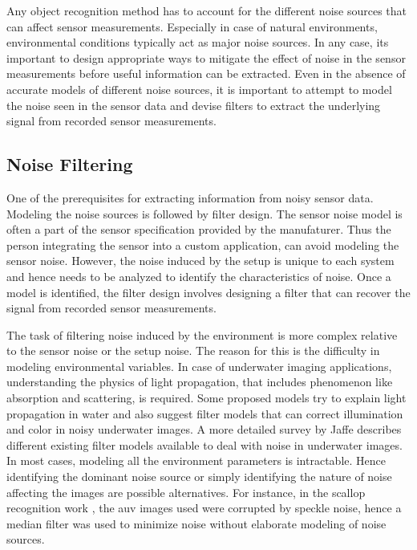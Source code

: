 \documentclass {udthesis}
\begin{document}
Any object recognition method has to account for the different noise sources that can affect sensor measurements. Especially in case of natural environments, environmental conditions typically act as major noise sources. 
In any case, its important to design appropriate ways to mitigate the effect of noise 
in the sensor measurements before useful information can be extracted. 
Even in the absence of accurate models of different noise sources, it is important to attempt to model the noise seen in the sensor data
and devise filters to extract the underlying signal from recorded sensor measurements.

\subsection{Noise Filtering}
\label{sec:noise_filters}

One of the prerequisites for extracting information from noisy sensor data. 
Modeling the noise sources is followed by filter design.
The sensor noise model is often a part of the sensor specification provided by the manufaturer. 
Thus the person integrating the sensor into a custom application, can avoid modeling the sensor noise. 
However, the noise induced by the setup is unique to each system and hence needs to be analyzed to identify the characteristics of noise.
Once a model is identified, the filter design involves designing a filter that can recover the signal from recorded sensor measurements.

The task of filtering noise induced by the environment is more complex relative to 
the sensor noise or the setup noise.
The reason for this is the difficulty in modeling environmental variables. 
In case of underwater imaging applications, understanding the physics of 
light propagation, that includes phenomenon like absorption and scattering, is required. Some proposed models \cite{garcia, ahlen} try to 
explain light propagation in water and also suggest filter models that can correct illumination and color in noisy underwater images. A more detailed survey
by Jaffe \cite{jaffe} describes different existing filter models available to deal with noise in underwater images.
In most cases, modeling all the environment parameters is intractable. Hence identifying the dominant noise source or simply identifying the nature of noise affecting the images are possible alternatives.
For instance, in the scallop recognition work \cite{prasanna_aslo}, the \gls{auv} images used were corrupted by speckle noise, hence a median filter \cite{despeckle} was used to minimize noise without elaborate modeling of noise sources.
\end{document}
